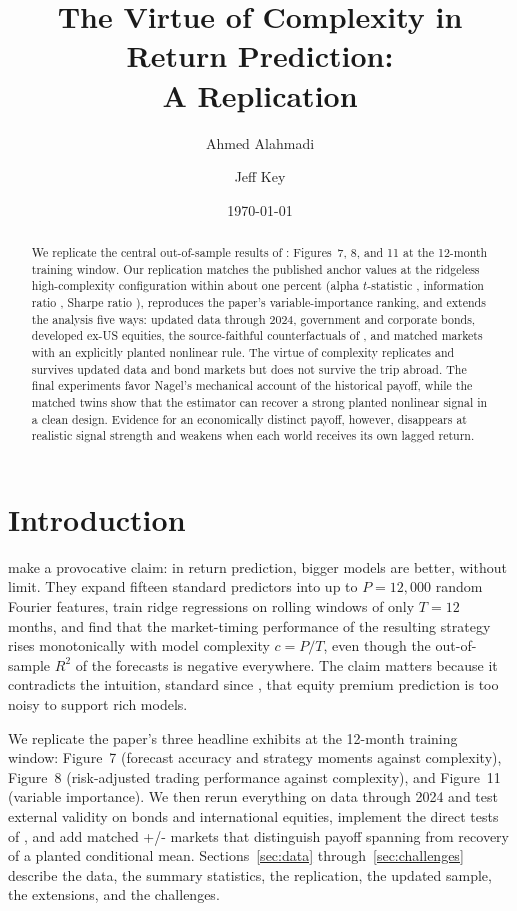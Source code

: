 \documentclass[12pt]{article}
\title{The Virtue of Complexity in Return Prediction:\\ A Replication}
\author{Ahmed Alahmadi \and Jeff Key}
\date{\today}
\begin{document}
\maketitle

\begin{abstract}
\noindent We replicate the central out-of-sample results of
\citet{kelly2024virtue}: Figures~7, 8, and 11 at the 12-month training
window. Our replication matches the published anchor values at the ridgeless
high-complexity configuration within about one percent (alpha $t$-statistic
\MktAlphaT, information ratio \MktIR, Sharpe ratio \MktSharpe), reproduces
the paper's variable-importance ranking, and extends the analysis five ways:
updated data through 2024, government and corporate bonds, developed ex-US
equities, the source-faithful counterfactuals of
\citet{nagel2025seemingly}, and matched markets with an explicitly planted
nonlinear rule. The virtue of complexity replicates and survives updated data
and bond markets but does not survive the trip abroad. The final experiments
favor Nagel's mechanical account of the historical payoff, while the matched
twins show that the estimator can recover a strong planted nonlinear signal in
a clean design. Evidence for an economically distinct payoff, however,
disappears at realistic signal strength and weakens when each world receives
its own lagged return.
\end{abstract}

\section{Introduction}

\citet{kelly2024virtue} make a provocative claim: in return prediction,
bigger models are better, without limit. They expand fifteen standard
predictors into up to $P = 12{,}000$ random Fourier features, train ridge
regressions on rolling windows of only $T=12$ months, and find that the
market-timing performance of the resulting strategy rises monotonically with
model complexity $c = P/T$, even though the out-of-sample $R^2$ of the
forecasts is negative everywhere. The claim matters because it contradicts
the intuition, standard since \citet{welch2008comprehensive}, that equity
premium prediction is too noisy to support rich models.

We replicate the paper's three headline exhibits at the 12-month training
window: Figure~7 (forecast accuracy and strategy moments against
complexity), Figure~8 (risk-adjusted trading performance against
complexity), and Figure~11 (variable importance). We then rerun everything
on data through 2024 and test external validity on bonds and international
equities, implement the direct tests of \citet{nagel2025seemingly}, and add
matched +/- markets that distinguish payoff spanning from recovery of a
planted conditional mean. Sections~\ref{sec:data}
through~\ref{sec:challenges} describe the data, the summary statistics, the
replication, the updated sample, the extensions, and the challenges.
\end{document}
